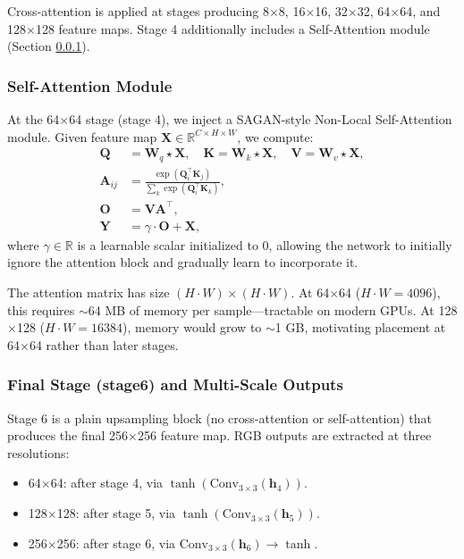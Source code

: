 \documentclass[conference]{IEEEtran}
\begin{document}
Cross-attention is applied at stages producing 8$\times$8, 16$\times$16, 32$\times$32, 64$\times$64, and 128$\times$128 feature maps. Stage 4 additionally includes a Self-Attention module (Section \ref{sec:self-attn}).

\subsubsection{Self-Attention Module}
\label{sec:self-attn}
At the 64$\times$64 stage (stage 4), we inject a SAGAN-style Non-Local Self-Attention module. Given feature map $\mathbf{X} \in \mathbb{R}^{C \times H \times W}$, we compute:
\begin{align}
    \mathbf{Q} &= \mathbf{W}_q \star \mathbf{X}, \quad \mathbf{K} = \mathbf{W}_k \star \mathbf{X}, \quad \mathbf{V} = \mathbf{W}_v \star \mathbf{X}, \\
    \mathbf{A}_{ij} &= \frac{\exp(\mathbf{Q}_i^\top \mathbf{K}_j)}{\sum_k \exp(\mathbf{Q}_i^\top \mathbf{K}_k)}, \\
    \mathbf{O} &= \mathbf{V} \mathbf{A}^\top, \\
    \mathbf{Y} &= \gamma \cdot \mathbf{O} + \mathbf{X},
\end{align}
where $\gamma \in \mathbb{R}$ is a learnable scalar initialized to 0, allowing the network to initially ignore the attention block and gradually learn to incorporate it.

The attention matrix has size $(H \cdot W) \times (H \cdot W)$. At 64$\times$64 ($H \cdot W = 4096$), this requires $\sim$64 MB of memory per sample---tractable on modern GPUs. At 128$\times$128 ($H \cdot W = 16384$), memory would grow to $\sim$1 GB, motivating placement at 64$\times$64 rather than later stages.

\subsubsection{Final Stage (stage6) and Multi-Scale Outputs}
Stage 6 is a plain upsampling block (no cross-attention or self-attention) that produces the final 256$\times$256 feature map. RGB outputs are extracted at three resolutions:
\begin{itemize}
    \item 64$\times$64: after stage 4, via $\tanh(\text{Conv}_{3\times3}(\mathbf{h}_4))$.
    \item 128$\times$128: after stage 5, via $\tanh(\text{Conv}_{3\times3}(\mathbf{h}_5))$.
    \item 256$\times$256: after stage 6, via $\text{Conv}_{3\times3}(\mathbf{h}_6) \rightarrow \tanh$.
\end{itemize}
\end{document}
